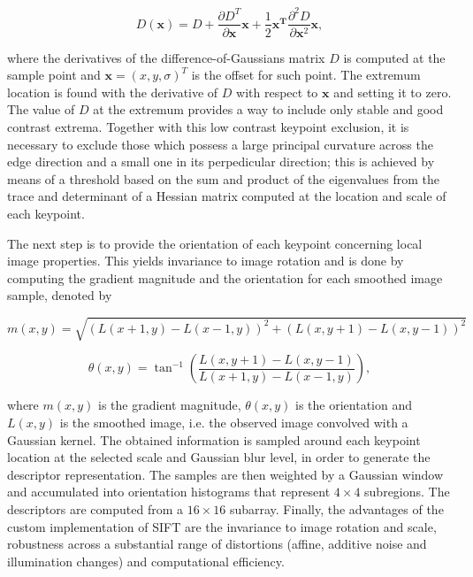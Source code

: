 \begin{equation}
\label{eqn:taylor_DoG}
D(\mathbf{x}) = D + 
                \frac{\partial D^{T}}{\partial  \mathbf{x}}\mathbf{x} + \frac{1}{2}\mathbf{x^{T}}\frac{\partial^{2} D}{\partial \mathbf{x}^{2}}\mathbf{x},
\end{equation}

\noindent where the derivatives of the difference-of-Gaussians matrix $D$ is computed at the sample point and $\mathbf{x} = (x,y,\sigma)^{T}$ is the offset for such point. The extremum location is found with the derivative of $D$ with respect to $\mathbf{x}$ and setting it to zero. The value of $D$ at the extremum provides a way to include only stable and good contrast extrema. Together with this low contrast keypoint exclusion, it is necessary to exclude those which possess a large principal curvature across the edge direction and a small one in its perpedicular direction; this is achieved by means of a threshold based on the sum and product of the eigenvalues from the trace and determinant of a Hessian matrix computed at the location and scale of each keypoint.

The next step is to provide the orientation of each keypoint concerning local image properties. This yields invariance to image rotation and is done by computing the gradient magnitude and the orientation for each smoothed image sample, denoted by

\begin{equation}
m(x,y) = \sqrt{(L(x + 1, y) - L(x - 1, y))^{2} + (L(x, y + 1) - L(x, y - 1))^{2}}
\end{equation}

\begin{equation}
\theta(x,y) = \tan^{-1}
			\left(
			\frac{L(x, y + 1) - L(x, y - 1)}
				 {L(x + 1, y) - L(x - 1, y)}
			\right),
\end{equation}

\noindent where $m(x,y)$ is the gradient magnitude, $\theta(x,y)$ is the orientation and $L(x,y)$ is the smoothed image, i.e. the observed image convolved with a Gaussian kernel. The obtained information is sampled around each keypoint location at the selected scale and Gaussian blur level, in order to generate the descriptor representation. The samples are then weighted by a Gaussian window and accumulated into orientation histograms that represent $4 \times 4$ subregions. The descriptors are computed from a $16 \times 16$ subarray. Finally, the advantages of the custom implementation of SIFT are the invariance to image rotation and scale, robustness across a substantial range of distortions (affine, additive noise and illumination changes) and computational efficiency.


